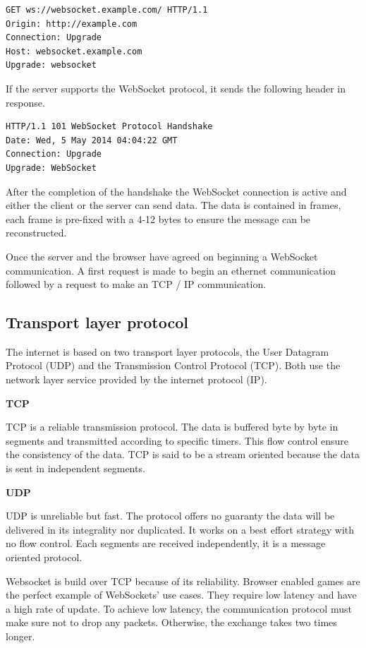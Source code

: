 \begin{verbatim}
GET ws://websocket.example.com/ HTTP/1.1
Origin: http://example.com
Connection: Upgrade
Host: websocket.example.com
Upgrade: websocket
\end{verbatim}

If the server supports the WebSocket protocol, it sends the following header in
response.

\begin{verbatim}
HTTP/1.1 101 WebSocket Protocol Handshake
Date: Wed, 5 May 2014 04:04:22 GMT
Connection: Upgrade
Upgrade: WebSocket
\end{verbatim}

After the completion of the handshake the WebSocket connection is active and
either the client or the server can send data. The data is contained in frames,
each frame is pre-fixed with a 4-12 bytes to ensure the message can be
reconstructed. 

Once the server and the browser have agreed on beginning a WebSocket
communication. A first request is made to begin an ethernet communication
followed by a request to make an TCP / IP communication.

\subsection{Transport layer protocol}

The internet is based on two transport layer protocols, the User Datagram
Protocol (UDP) and the Transmission Control Protocol (TCP). Both use the
network layer service provided by the internet protocol (IP). 

\textbf{TCP}

TCP is a reliable transmission protocol. The data is buffered byte by byte in
segments and transmitted according to specific timers. This flow control ensure
the consistency of the data. TCP is said to be a stream oriented because the
data is sent in independent segments.

\textbf{UDP}

UDP is unreliable but fast. The protocol offers no guaranty the data will be
delivered in its integrality nor duplicated. It works on a best effort strategy
with no flow control. Each segments are received independently, it is a message
oriented protocol.

Websocket is build over TCP because of its reliability. Browser enabled games
are the perfect example of WebSockets' use cases. They require low latency and
have a high rate of update. To achieve low latency, the communication protocol
must make sure not to drop any packets. Otherwise, the exchange takes two times
longer.

